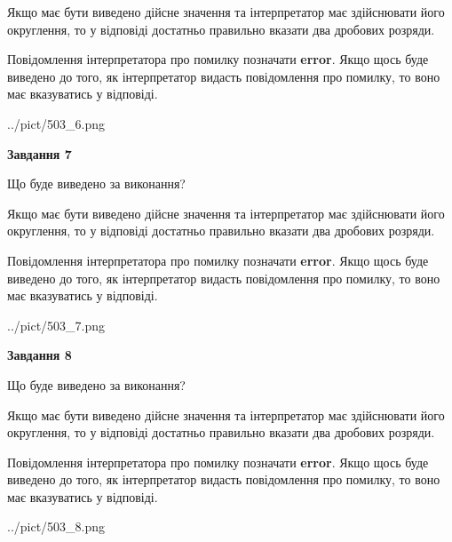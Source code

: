\documentclass[12pt, ukrainian]{article}
\begin{document}
{\begin {Large}
Якщо має бути виведено дійсне значення та інтерпретатор має здійснювати його округлення, 
то у відповіді достатньо правильно вказати два дробових розряди.

Повідомлення інтерпретатора про помилку позначати \textbf{error}.
Якщо щось буде виведено до того, як інтерпретатор видасть повідомлення про помилку, 
то воно має вказуватись у відповіді. \par

\begin{center}
	{../pict/503_6.png}
\end{center}
\newpage

{\begin {center}\textbf{Завдання 7}\end {center}}\par
Що буде виведено за виконання? \par

Якщо має бути виведено дійсне значення та інтерпретатор має здійснювати його округлення, 
то у відповіді достатньо правильно вказати два дробових розряди.

Повідомлення інтерпретатора про помилку позначати \textbf{error}.
Якщо щось буде виведено до того, як інтерпретатор видасть повідомлення про помилку, 
то воно має вказуватись у відповіді. \par

\begin{center}
	{../pict/503_7.png}
\end{center}
\newpage

{\begin {center}\textbf{Завдання 8}\end {center}}\par
Що буде виведено за виконання? \par

Якщо має бути виведено дійсне значення та інтерпретатор має здійснювати його округлення, 
то у відповіді достатньо правильно вказати два дробових розряди.

Повідомлення інтерпретатора про помилку позначати \textbf{error}.
Якщо щось буде виведено до того, як інтерпретатор видасть повідомлення про помилку, 
то воно має вказуватись у відповіді. \par

\begin{center}
	{../pict/503_8.png}
\end{center}
\newpage


\end{Large}}
\end{document}
